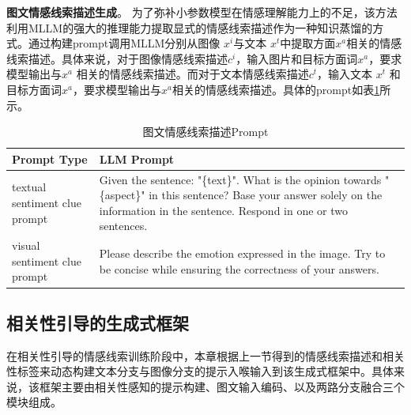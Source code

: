 \textbf{图文情感线索描述生成}。
为了弥补小参数模型在情感理解能力上的不足，该方法利用MLLM的强大的推理能力提取显式的情感线索描述作为一种知识蒸馏的方式。通过构建prompt调用MLLM分别从图像 $x^i$与文本 $x^t$中提取方面$x^a$相关的情感线索描述。具体来说，对于图像情感线索描述$c^i$，输入图片和目标方面词$x^a$，要求模型输出与$x^a$ 相关的情感线索描述。而对于文本情感线索描述$c^t$，输入文本 $x^t$ 和目标方面词$x^a$，要求模型输出与$x^a$相关的情感线索描述。具体的prompt如表\ref{second:prompts}所示。


\begin{table}[htbp]
\centering
\caption{图文情感线索描述Prompt}
\label{second:prompts}
\begin{tabular}{@{}>{\raggedright\arraybackslash}p{4cm} >{\raggedright\arraybackslash}p{10cm}@{}}
\toprule
\textbf{Prompt Type} & \textbf{LLM Prompt} \\
\midrule
textual sentiment clue prompt & Given the sentence: "\{text\}". What is the opinion towards "\{aspect\}" in this sentence? Base your answer solely on the information in the sentence. Respond in one or two sentences. \\
\addlinespace
visual sentiment clue prompt & Please describe the emotion expressed in the image. Try to be concise while ensuring the correctness of your answers. \\
\bottomrule
\end{tabular}
\end{table}

\subsection{相关性引导的生成式框架}
在相关性引导的情感线索训练阶段中，本章根据上一节得到的情感线索描述和相关性标签来动态构建文本分支与图像分支的提示入喉输入到该生成式框架中。具体来说，该框架主要由相关性感知的提示构建、图文输入编码、以及两路分支融合三个模块组成。

